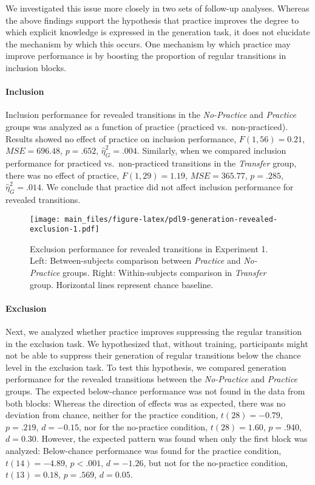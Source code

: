 \documentclass[english,,man]{apa6}
\begin{document}
We investigated this issue more closely in two sets of follow-up analyses.
Whereas the above findings support the hypothesis that practice improves the degree to which explicit knowledge is expressed in the generation task, it does not elucidate the mechanism by which this occurs.
One mechanism by which practice may improve performance is by boosting the proportion of regular transitions in inclusion blocks.

\hypertarget{inclusion-1}{%
\paragraph{Inclusion}\label{inclusion-1}}

Inclusion performance for revealed transitions in the \emph{No-Practice} and \emph{Practice} groups was analyzed as a function of practice (practiced vs.~non-practiced).
Results showed no effect of practice on inclusion performance, \(F(1, 56) = 0.21\), \(\mathit{MSE} = 696.48\), \(p = .652\), \(\hat{\eta}^2_G = .004\).
Similarly, when we compared inclusion performance for practiced vs.~non-practiced transitions in the \emph{Transfer} group, there was no effect of practice, \(F(1, 29) = 1.19\), \(\mathit{MSE} = 365.77\), \(p = .285\), \(\hat{\eta}^2_G = .014\).
We conclude that practice did not affect inclusion performance for revealed transitions.

\begin{figure}
\centering
\texttt{[image: main\_files/figure-latex/pdl9-generation-revealed-exclusion-1.pdf]}
\caption{\label{fig:pdl9-generation-revealed-exclusion}Exclusion performance for revealed transitions in Experiment 1. Left: Between-subjects comparison between \emph{Practice} and \emph{No-Practice} groups. Right: Within-subjects comparison in \emph{Transfer} group. Horizontal lines represent chance baseline.}
\end{figure}

\hypertarget{exclusion-1}{%
\paragraph{Exclusion}\label{exclusion-1}}

Next, we analyzed whether practice improves suppressing the regular transition in the exclusion task.
We hypothesized that, without training, participants might not be able to suppress their generation of regular transitions below the chance level in the exclusion task.
To test this hypothesis, we compared generation performance for the revealed transitions between the \emph{No-Practice} and \emph{Practice} groups.
The expected below-chance performance was not found in the data from both blocks:
Whereas the direction of effects was as expected, there was no deviation from chance, neither for the practice condition, \(t(28) = -0.79\), \(p = .219\), \(d = -0.15\), nor for the no-practice condition, \(t(28) = 1.60\), \(p = .940\), \(d = 0.30\).
However, the expected pattern was found when only the first block was analyzed: Below-chance performance was found for the practice condition, \(t(14) = -4.89\), \(p < .001\), \(d = -1.26\), but not for the no-practice condition, \(t(13) = 0.18\), \(p = .569\), \(d = 0.05\).
\end{document}
